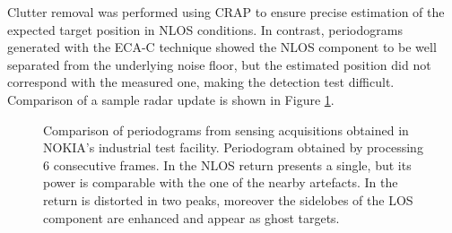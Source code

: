Clutter removal was performed using CRAP to ensure precise estimation of the expected target position in NLOS conditions. In contrast, periodograms generated with the ECA-C technique showed the NLOS component to be well separated from the underlying noise floor, but the estimated position did not correspond with the measured one, making the detection test difficult. Comparison of a sample radar update is shown in Figure \ref{fig:Test1_huma_crap-ecac}.

	\begin{figure}[H]
	\centering
	
	\hfill
	\caption[]{\small Comparison of periodograms from sensing acquisitions obtained in NOKIA's industrial test facility.
		Periodogram obtained by processing 6 consecutive frames.
		In  the NLOS return presents a single, but its power is comparable with the one of the nearby artefacts. In  the return is distorted in two peaks, moreover the sidelobes of the LOS component are enhanced and appear as ghost targets.}
	\label{fig:Test1_huma_crap-ecac}
\end{figure}
